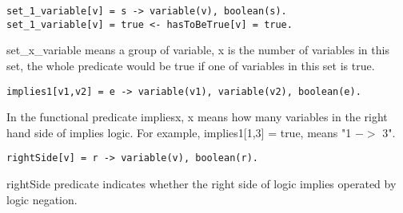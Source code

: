 \documentclass[11pt]{article}
\begin{document}
\begin{lstlisting}
set_1_variable[v] = s -> variable(v), boolean(s).
set_1_variable[v] = true <- hasToBeTrue[v] = true.
\end{lstlisting}
set\_x\_variable means a group of variable, x is the number of variables in this set, the whole predicate would be true if one of variables in this set is true.

\begin{lstlisting}
implies1[v1,v2] = e -> variable(v1), variable(v2), boolean(e).
\end{lstlisting}
In the functional predicate impliesx, x means how many variables in the right hand side of implies logic. For example, implies1[1,3] = true, means "1 $->$ 3".

\begin{lstlisting}
rightSide[v] = r -> variable(v), boolean(r).
\end{lstlisting}
rightSide predicate indicates whether the right side of logic implies operated by logic negation.


 \par 
\end{document}
